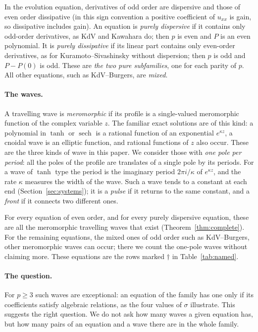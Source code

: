 \documentclass[11pt]{article}
\theoremstyle{definition}
\theoremstyle{remark}
\numberwithin{equation}{section}
\begin{document}
In the evolution equation, derivatives of odd order are dispersive and
those of even order dissipative (in this sign convention a positive
coefficient of \(u_{xx}\) is gain, so dissipative includes gain). An
equation is \emph{purely dispersive} if it contains only odd-order
derivatives, as KdV and Kawahara do; then \(p\) is even and \(P\) is an
even polynomial. It is \emph{purely dissipative} if its linear part
contains only even-order derivatives, as for Kuramoto--Sivashinsky
without dispersion; then \(p\) is odd and \(P-P(0)\) is odd. These are
\emph{the two pure subfamilies}, one for each parity of \(p\). All other
equations, such as KdV--Burgers, are \emph{mixed}.

\paragraph{The waves.}
A travelling wave is \emph{meromorphic} if its profile is a
single-valued meromorphic function of the complex variable \(z\). The
familiar exact solutions are of this kind: a polynomial in \(\tanh\) or
\(\operatorname{sech}\) is a rational function of an exponential
\(e^{\kappa z}\), a cnoidal wave is an elliptic function, and rational
functions of \(z\) also occur. These are the three kinds of wave in this
paper. We consider those with \emph{one pole per period}: all the poles
of the profile are translates of a single pole by its periods. For a
wave of \(\tanh\) type the period is the imaginary period
\(2\pi i/\kappa\) of \(e^{\kappa z}\), and the rate \(\kappa\) measures
the width of the wave. Such a wave tends to a constant at each end
(Section~\ref{sec:systems}); it is a \emph{pulse} if it returns to the
same constant, and a \emph{front} if it connects two different ones.

For every equation of even order, and for every purely dispersive
equation, these are all the meromorphic travelling waves that exist
(Theorem~\ref{thm:complete}). For the remaining equations, the mixed
ones of odd order such as KdV--Burgers, other meromorphic waves can
occur; there we count the one-pole waves without claiming more. These
equations are the rows marked \(\dagger\) in Table~\ref{tab:named}.

\paragraph{The question.}
For \(p\ge3\) such waves are exceptional: an equation of the family has
one only if its coefficients satisfy algebraic relations, as the four
values of \(\sigma\) illustrate. This suggests the right question. We do
not ask how many waves a given equation has, but how many pairs of an
equation and a wave there are in the whole family.
\end{document}
